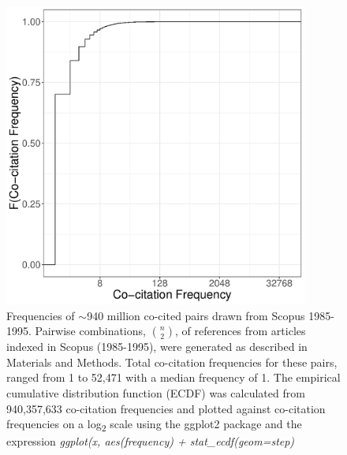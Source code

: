 \documentclass[utf8]{frontiersSCNS}
\begin{document}

\begin{figure}[h!]
\begin{center}
\includegraphics[width=10cm]{fig1}%
\end{center}
\caption{Frequencies of $\sim$940 million co-cited pairs drawn from Scopus 1985-1995. Pairwise combinations, $n\choose 2$, of references from articles indexed in Scopus (1985-1995), were generated as described in Materials and Methods. Total co-citation frequencies for these pairs, ranged from 1 to 52,471 with a median frequency of 1. The empirical cumulative distribution function (ECDF) was calculated from 940,357,633 co-citation frequencies and plotted against co-citation frequencies on a log\textsubscript{2} scale using the ggplot2 package and the expression \emph{ggplot(x, aes(frequency) + stat\_ecdf(geom=\textquotesingle step\textquotesingle)}}
\label{fig:fig1}
\end{figure}
\end{document}
